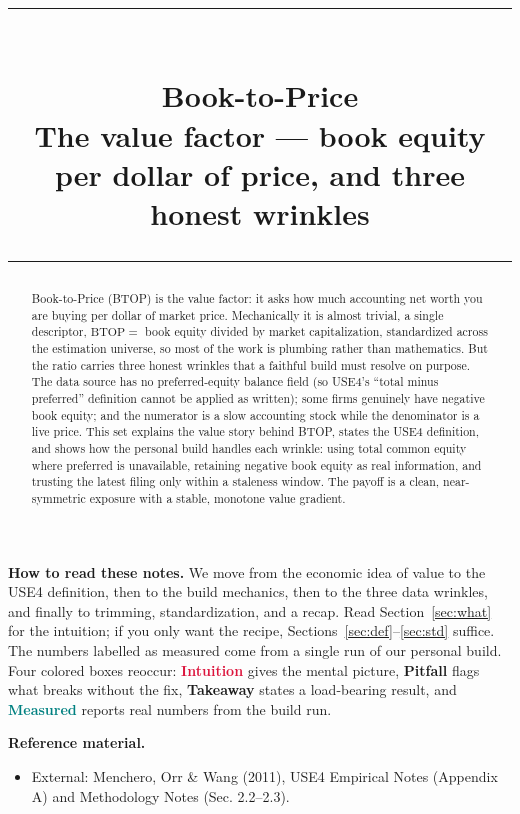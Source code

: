 \documentclass[11pt]{article}
\title{\vspace{-2.2em}
  {\color{steel}\rule{\textwidth}{1.3pt}}\\[0.7em]
  \Huge\bfseries Book-to-Price\\[0.35em]
  \large\mdseries The value factor --- book equity per dollar of price, and three honest wrinkles\\[0.4em]
  {\color{steel}\rule{\textwidth}{0.7pt}}}
\author{}
\date{}
\theoremstyle{definition}
\theoremstyle{plain}
\theoremstyle{remark}
\begin{document}
\maketitle
\thispagestyle{empty}

\begin{abstract}
Book-to-Price (BTOP) is the value factor: it asks how much accounting net worth you are buying per dollar of market price. Mechanically it is almost trivial, a single descriptor, $\mathrm{BTOP}=$ book equity divided by market capitalization, standardized across the estimation universe, so most of the work is plumbing rather than mathematics. But the ratio carries three honest wrinkles that a faithful build must resolve on purpose. The data source has no preferred-equity balance field (so USE4's ``total minus preferred'' definition cannot be applied as written); some firms genuinely have negative book equity; and the numerator is a slow accounting stock while the denominator is a live price. This set explains the value story behind BTOP, states the USE4 definition, and shows how the personal build handles each wrinkle: using total common equity where preferred is unavailable, retaining negative book equity as real information, and trusting the latest filing only within a staleness window. The payoff is a clean, near-symmetric exposure with a stable, monotone value gradient.
\end{abstract}

\begin{tcolorbox}[colback=paperlt,colframe=ink!30,boxrule=0.4pt,arc=2pt,left=10pt,right=10pt,top=8pt,bottom=8pt]
\textbf{How to read these notes.} We move from the economic idea of value to the USE4 definition, then to the build mechanics, then to the three data wrinkles, and finally to trimming, standardization, and a recap. Read Section~\ref{sec:what} for the intuition; if you only want the recipe, Sections~\ref{sec:def}--\ref{sec:std} suffice. The numbers labelled as measured come from a single run of our personal build. Four colored boxes reoccur: \textcolor{crimson}{\textbf{Intuition}} gives the mental picture, \textcolor{amber}{\textbf{Pitfall}} flags what breaks without the fix, \textcolor{steel}{\textbf{Takeaway}} states a load-bearing result, and \textcolor{teal}{\textbf{Measured}} reports real numbers from the build run.

\medskip
\textbf{Reference material.}
\begin{itemize}[leftmargin=1.4em,nosep]
  \item External: Menchero, Orr \& Wang (2011), USE4 Empirical Notes (Appendix A) and Methodology Notes (Sec. 2.2--2.3).
\end{itemize}
\end{tcolorbox}
\end{document}
